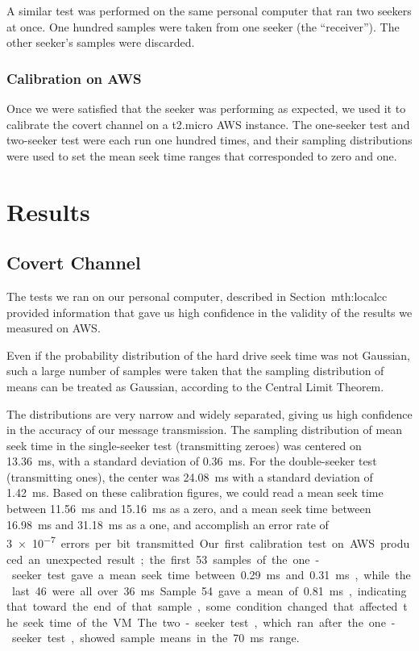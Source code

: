 \documentclass[conference]{IEEEtran}
\begin{document}
A similar test was performed on the same personal computer that ran two seekers at once.
One hundred samples were taken from one seeker (the ``receiver'').
The other seeker's samples were discarded.

\subsubsection{Calibration on AWS}
Once we were satisfied that the seeker was performing as expected, we used it to calibrate the covert channel on a
  t2.micro AWS instance.
The one-seeker test and two-seeker test were each run one hundred times, and their sampling distributions were
  used to set the mean seek time ranges that corresponded to zero and one.

\section{Results}
\subsection{Covert Channel}
The tests we ran on our personal computer, described in Section~{mth:localcc} provided information that gave us high
  confidence in the validity of the results we measured on AWS.

Even if the probability distribution of the hard drive seek time was not Gaussian, such a large number of samples were
  taken that the sampling distribution of means can be treated as Gaussian, according to the Central Limit Theorem.

The distributions are very narrow and widely separated, giving us high confidence in the accuracy of our message
  transmission.
The sampling distribution of mean seek time in the single-seeker test (transmitting zeroes) was centered on
  \SI{13.36}{ms}, with a standard deviation of \SI{0.36}{ms}.
For the double-seeker test (transmitting ones), the center was \SI{24.08}{ms} with a standard deviation of
  \SI{1.42}{ms}.
Based on these calibration figures, we could read a mean seek time between \SI{11.56}{ms} and \SI{15.16}{ms}
  as a zero, and a mean seek time between \SI{16.98}{ms} and \SI{31.18}{ms} as a one, and accomplish an error rate of
  \SI{3e-7} errors per bit transmitted.

Our first calibration test on AWS produced an unexpected result; the first \num{53} samples of the one-seeker test gave
  a mean seek time between \SI{0.29}{ms} and \SI{0.31}{ms}, while the last \num{46} were all over \SI{36}{ms}.
Sample \num{54} gave a mean of \SI{0.81}{ms}, indicating that toward the end of that sample, some condition changed
  that affected the seek time of the VM.
The two-seeker test, which ran after the one-seeker test, showed sample means in the \SI{70}{ms} range.
\end{document}
